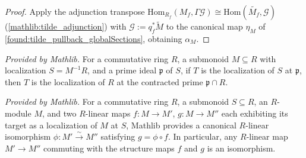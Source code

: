 \begin{proof}
  \leanok
  Apply the adjunction transpose \(\mathrm{Hom}_{R_f}(M_f,\Gamma\mathcal G)\cong
  \mathrm{Hom}(\widetilde{M_f},\mathcal G)\) (\cref{mathlib:tilde_adjunction}) with
  \(\mathcal G:=q_f^{*}\widetilde M\) to the canonical map \(\eta_M\) of
  \cref{found:tilde_pullback_globalSections}, obtaining \(\alpha_M\).
\end{proof}


\begin{lemma}
  \label{mathlib:localization_localization_atPrime}
  \mathlibok
  \textit{Provided by Mathlib.}
  For a commutative ring \(R\), a submonoid \(M\subseteq R\) with localization
  \(S=M^{-1}R\), and a prime ideal \(\mathfrak p\) of \(S\), if \(T\) is the
  localization of \(S\) at \(\mathfrak p\), then \(T\) is the localization of \(R\) at
  the contracted prime \(\mathfrak p\cap R\).
\end{lemma}

\begin{lemma}
  \label{mathlib:isLocalizedModule_uniqueness}
  \mathlibok
  \textit{Provided by Mathlib.}
  For a commutative ring \(R\), a submonoid \(S\subseteq R\), an \(R\)-module \(M\), and
  two \(R\)-linear maps \(f:M\to M'\), \(g:M\to M''\) each exhibiting its target as a
  localization of \(M\) at \(S\), Mathlib provides a canonical \(R\)-linear isomorphism
  \(\phi:M'\xrightarrow{\sim}M''\) satisfying \(g=\phi\circ f\).  In particular, any
  \(R\)-linear map \(M'\to M''\) commuting with the structure maps \(f\) and \(g\) is
  an isomorphism.
\end{lemma}


